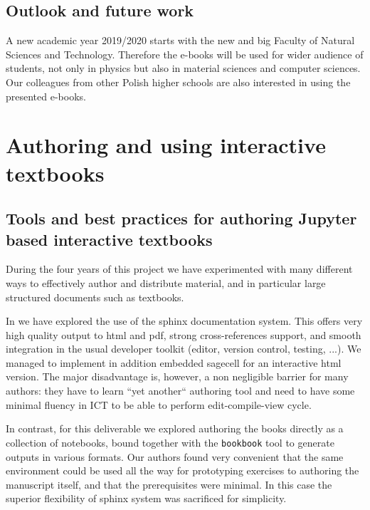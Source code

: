 \documentclass{deliverablereport}
\begin{document}
{{{\subsection{Outlook and future work}

A new academic year 2019/2020 starts with the new and big Faculty of
Natural Sciences and Technology. Therefore the e-books will be used
for wider audience of students, not only in physics but also in
material sciences and computer sciences. Our colleagues from other
Polish higher schools are also interested in using the presented
e-books.


\section{Authoring and using interactive textbooks}\label{sec:auth-using-inter}

\subsection{Tools and best practices for authoring Jupyter based
  interactive textbooks}\label{sec:good-pract-softw}

During the four years of this project we have experimented with many
different ways to effectively author and distribute material, and in
particular large structured documents such as textbooks.

In  we have explored the use of the
sphinx documentation system. This offers very high quality output to
html and pdf, strong cross-references support, and smooth integration
in the usual developer toolkit (editor, version control, testing,
...). We managed to implement in addition embedded sagecell for an
interactive html version. The major disadvantage is, however, a non
negligible barrier for many authors: they have to learn ``yet
another`` authoring tool and need to have some minimal fluency in ICT
to be able to perform edit-compile-view cycle.

In contrast, for this deliverable we explored authoring the books
directly as a collection of \Jupyter notebooks, bound together with
the \texttt{bookbook} tool to generate outputs in various formats. Our
authors found very convenient that the same environment could be used
all the way for prototyping exercises to authoring the manuscript
itself, and that the prerequisites were minimal. In this case the
superior flexibility of sphinx system was sacrificed for simplicity.

}}}
\end{document}
